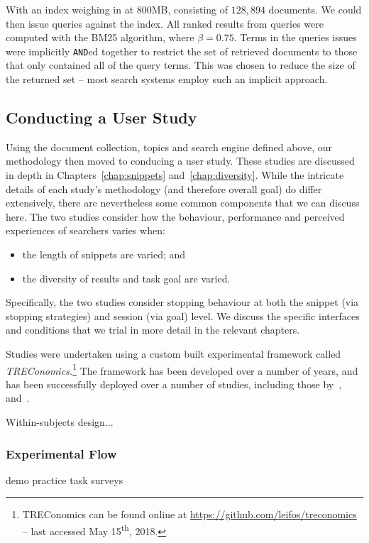 With an index weighing in at 800MB, consisting of $128,894$ documents.  We could then issue queries against the index. All ranked results from queries were computed with the BM25 algorithm, where $\beta=0.75$. Terms in the queries issues were implicitly \texttt{AND}ed together to restrict the set of retrieved documents to those that only contained all of the query terms. This was chosen to reduce the size of the returned set -- most search systems employ such an implicit approach.

\subsection{Conducting a User Study}
Using the document collection, topics and search engine defined above, our methodology then moved to conducing a user study. These studies are discussed in depth in Chapters~\ref{chap:snippets} and~\ref{chap:diversity}. While the intricate details of each study's methodology (and therefore overall goal) do differ extensively, there are nevertheless some common components that we can discuss here. The two studies consider how the behaviour, performance and perceived experiences of searchers varies when:

\begin{itemize}
    \item{the length of snippets are varied; and}
    \item{the diversity of results and task goal are varied.}
\end{itemize}

Specifically, the two studies consider stopping behaviour at both the snippet (via stopping strategies) and session (via goal) level. We discuss the specific interfaces and conditions that we trial in more detail in the relevant chapters.

Studies were undertaken using a custom built experimental framework called \emph{TREConomics.}\footnote{TREConomics can be found online at \url{https://github.com/leifos/treconomics} -- last accessed May 15\textsuperscript{th}, 2018.} The framework has been developed over a number of years, and has been successfully deployed over a number of studies, including those by~\cite{azzopardi2013query_cost},~\cite{maxwell2014temporal_delays} and~\cite{kelly2015serp_size}.

Within-subjects design...

\subsubsection{Experimental Flow}\label{sec:csm:methodology:user:flow}
demo
practice
task
surveys

